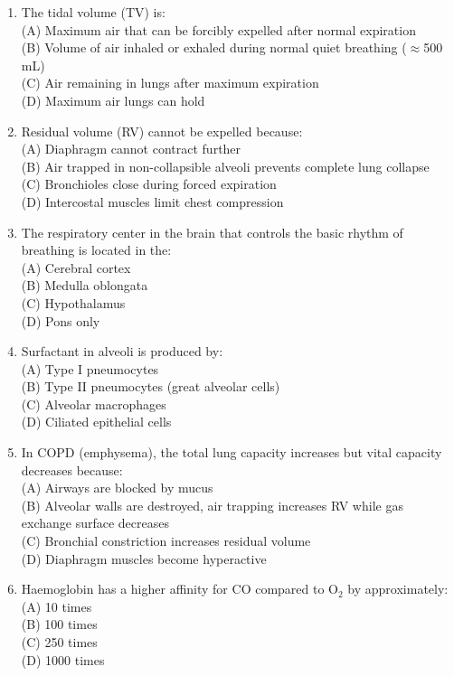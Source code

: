 \documentclass{article}
\begin{document}
\begin{enumerate}[label=Q\arabic*.]
\item The tidal volume (TV) is:
\\(A) Maximum air that can be forcibly expelled after normal expiration
\\(B) Volume of air inhaled or exhaled during normal quiet breathing ($\approx$500 mL)
\\(C) Air remaining in lungs after maximum expiration
\\(D) Maximum air lungs can hold

\item Residual volume (RV) cannot be expelled because:
\\(A) Diaphragm cannot contract further
\\(B) Air trapped in non-collapsible alveoli prevents complete lung collapse
\\(C) Bronchioles close during forced expiration
\\(D) Intercostal muscles limit chest compression

\item The respiratory center in the brain that controls the basic rhythm of breathing is located in the:
\\(A) Cerebral cortex
\\(B) Medulla oblongata
\\(C) Hypothalamus
\\(D) Pons only

\item Surfactant in alveoli is produced by:
\\(A) Type I pneumocytes
\\(B) Type II pneumocytes (great alveolar cells)
\\(C) Alveolar macrophages
\\(D) Ciliated epithelial cells

\item In COPD (emphysema), the total lung capacity increases but vital capacity decreases because:
\\(A) Airways are blocked by mucus
\\(B) Alveolar walls are destroyed, air trapping increases RV while gas exchange surface decreases
\\(C) Bronchial constriction increases residual volume
\\(D) Diaphragm muscles become hyperactive

\item Haemoglobin has a higher affinity for CO compared to O$_2$ by approximately:
\\(A) 10 times
\\(B) 100 times
\\(C) 250 times
\\(D) 1000 times


\end{enumerate}
\end{document}
